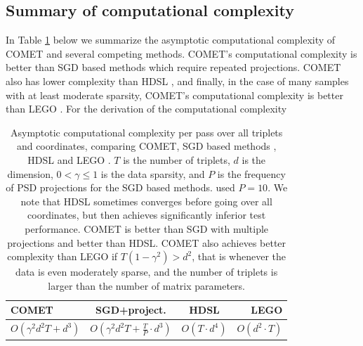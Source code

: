 \documentclass{article} %
\begin{document}
\subsection{Summary of computational complexity}

In Table \ref{comp-complx} below we summarize the asymptotic computational complexity of COMET and several competing methods. COMET's computational complexity is better than SGD based methods \cite{OASIS, qian} which require repeated projections. COMET also has lower complexity than HDSL \cite{hdsl}, and finally, in the case of many samples with at least moderate sparsity, COMET's computational complexity is better than LEGO \cite{lego}. For the derivation of the computational complexity 


\begin{table}[t]
\caption{Asymptotic computational complexity per pass over all triplets and coordinates, comparing COMET, SGD based methods \cite{OASIS, qian}, HDSL \cite{hdsl} and LEGO \cite{lego}. $T$ is the number of triplets, $d$ is the dimension, $0<\gamma \leq 1$ is the data sparsity, and $P$ is the frequency of PSD projections for the SGD based methods. \citeauthor{qian} used $P=10$. We note that HDSL sometimes converges before going over all coordinates, but then achieves significantly inferior test performance. COMET is better than SGD with multiple projections and better than HDSL. COMET also achieves better complexity than LEGO if $T(1-\gamma^2) > d^2$, that is whenever the data is even moderately sparse, and the number of triplets is larger than the number of matrix parameters.}
\label{comp-complx}
\vskip 0.15in
\begin{center}
\begin{small}
\begin{sc}
\begin{tabular}{lccr}
\hline
 COMET  & SGD+project.  & HDSL    & LEGO         \\ 
\hline
$O(\gamma^2 d^2 T +  d^3)$&  $O(\gamma^2 d^2 T + \frac{T}{P} \cdot d^3)$
&   $O( T\cdot  d^4)$ &   $O(d^2 \cdot T)$  \\
\hline
\end{tabular}
\end{sc}
\end{small}
\end{center}
\vskip -0.1in
\end{table}
\end{document}
